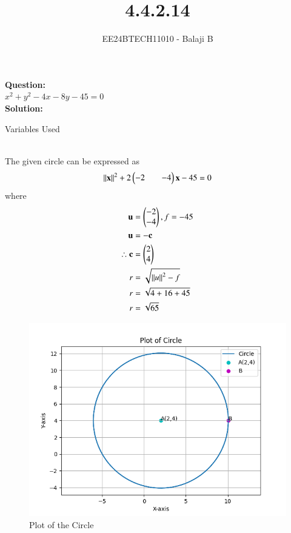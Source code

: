 \documentclass[journal]{IEEEtran}
\begin{document}

\vspace{3cm}

\title{4.4.2.14}
\author{EE24BTECH11010 - Balaji B}
{\let\newpage\relax\maketitle}
\textbf{Question:}\\
$x^2 + y^2 - 4x - 8y - 45 = 0$ \\
\textbf{Solution:}\\
\begin{table}[h!]    
  \centering
  
  \caption{Variables Used}
  \label{tab1-1.9-6}
  \end{table}\\
  The given circle can be expressed as \\
  \begin{align}
      \left\lVert\mathbf{x}\right\rVert^2 +2\begin{pmatrix}-2 && -4\end{pmatrix}\mathbf{x} - 45 = 0
  \end{align}
  where 
  \begin{align}
      \mathbf{u} &= \begin{pmatrix}-2 \\ -4\end{pmatrix}, f = -45 \\
      \mathbf{u} &= -\mathbf{c}\\
       \therefore \mathbf{c} &= \begin{pmatrix}2 \\ 4\end{pmatrix}\\
      r &= \sqrt{\left\lVert u\right\rVert^2 - f} \\
      r &= \sqrt{4 + 16 + 45} \\
      r &= \sqrt{65}
  \end{align}

  \begin{figure}[h!]
  \centering
  \includegraphics[width=0.7\linewidth]{figs/fig.png}
  \caption{Plot of the Circle}
   \label{stemplot}
\end{figure}
\end{document}
